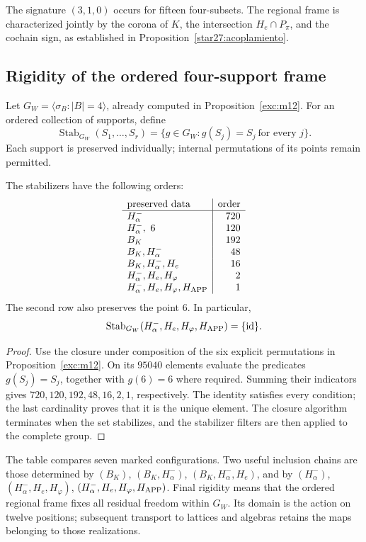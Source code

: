 The signature \((3,1,0)\) occurs for fifteen four-subsets.
The regional frame is characterized jointly by the corona of
\(K\), the intersection \(H_e\cap P_\pi\), and the cochain
sign, as established in Proposition~\ref{star27:acoplamiento}.

\subsection{Rigidity of the ordered four-support frame}
\label{star27:rigidez}

Let \(G_W=\langle\sigma_B:|B|=4\rangle\), already computed
in Proposition~\ref{exc:m12}. For an ordered collection of
supports, define
\[
\operatorname{Stab}_{G_W}(S_1,\ldots,S_r)
=\{g\in G_W:g(S_j)=S_j\ \text{for every }j\}.
\]
Each support is preserved individually; internal permutations
of its points remain permitted.

\begin{theorem}
\label{star27:marco}
The stabilizers have the following orders:
\[
\begin{array}{l|r}
\text{preserved data}&\text{order}\\ \hline
H^-_\alpha&720\\
H^-_\alpha,\ 6&120\\
B_K&192\\
B_K,H^-_\alpha&48\\
B_K,H^-_\alpha,H_e&16\\
H^-_\alpha,H_e,H_\varphi&2\\
H^-_\alpha,H_e,H_\varphi,H_{\rm APP}&1
\end{array}
\]
The second row also preserves the point \(6\).
In particular,
\[
\operatorname{Stab}_{G_W}
(H^-_\alpha,H_e,H_\varphi,H_{\rm APP})=\{\operatorname{id}\}.
\]
\end{theorem}

\begin{proof}
Use the closure under composition of the six explicit
permutations in Proposition~\ref{exc:m12}. On its \(95040\)
elements evaluate the predicates \(g(S_j)=S_j\), together
with \(g(6)=6\) where required. Summing their indicators
gives \(720,120,192,48,16,2,1\), respectively. The identity
satisfies every condition; the last cardinality proves
that it is the unique element. The closure algorithm
terminates when the set stabilizes, and the stabilizer
filters are then applied to the complete group.
\end{proof}

The table compares seven marked configurations. Two useful
inclusion chains are those determined by
\((B_K)\), \((B_K,H^-_\alpha)\),
\((B_K,H^-_\alpha,H_e)\), and by
\((H^-_\alpha)\), \((H^-_\alpha,H_e,H_\varphi)\),
\((H^-_\alpha,H_e,H_\varphi,H_{\rm APP})\).
Final rigidity means that the ordered regional frame fixes
all residual freedom within \(G_W\). Its domain is the
action on twelve positions; subsequent transport to
lattices and algebras retains the maps belonging to
those realizations.

